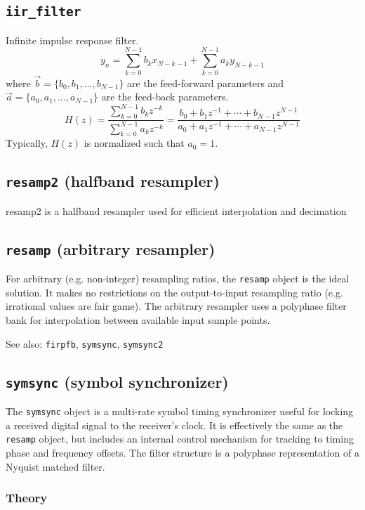 \subsection{{\tt iir\_filter}}
Infinite impulse response filter.
\[
    y_n = \sum_{k=0}^{N-1}{ b_k x_{N-k-1} } +
          \sum_{k=0}^{N-1}{ a_k y_{N-k-1} }
\]
where $\vec{b} = \{b_0,b_1,\ldots,b_{N-1}\}$ are the feed-forward parameters
and $\vec{a} = \{a_0,a_1,\ldots,a_{N-1}\}$ are the feed-back parameters.
\[
    H(z) = \frac{\sum_{k=0}^{N-1}{b_k z^{-k}}}
                {\sum_{k=0}^{N-1}{a_k z^{-k}}}
         = \frac{ b_0 + b_1 z^{-1} + \cdots + b_{N-1} z^{N-1}}
                { a_0 + a_1 z^{-1} + \cdots + a_{N-1} z^{N-1}}
\]
Typically, $H(z)$ is normalized such that $a_0=1$.

\subsection{{\tt resamp2} (halfband resampler)}
resamp2 is a halfband resampler used for efficient interpolation and
decimation

\subsection{{\tt resamp} (arbitrary resampler)}
For arbitrary (e.g. non-integer) resampling ratios, the {\tt resamp} object is
the ideal solution.
It makes no restrictions on the output-to-input resampling ratio (e.g.
irrational values are fair game).
The arbitrary resampler uses a polyphase filter bank for interpolation between
available input sample points.

See also: {\tt firpfb}, {\tt symsync}, {\tt symsync2}

\subsection{{\tt symsync} (symbol synchronizer)}
The {\tt symsync} object is a multi-rate symbol timing synchronizer useful for
locking a received digital signal to the receiver's clock.
It is effectively the same as the {\tt resamp} object, but includes an
internal control mechanism for tracking to timing phase and frequency offsets.
The filter structure is a polyphase representation of a Nyquist matched
filter.

\subsubsection{Theory}

